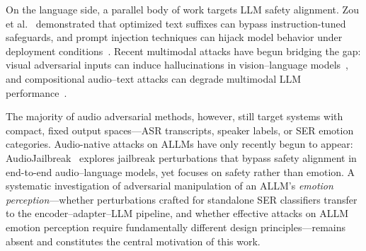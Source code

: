 On the language side, a parallel body of work targets LLM safety alignment.
Zou et al.~\cite{zou2023gcg} demonstrated that optimized text suffixes can bypass instruction-tuned safeguards, and prompt injection techniques can hijack model behavior under deployment conditions~\cite{perez2022ignore}.
Recent multimodal attacks have begun bridging the gap: visual adversarial inputs can induce hallucinations in vision--language models~\cite{mirage}, and compositional audio--text attacks can degrade multimodal LLM performance~\cite{sacred}.

The majority of audio adversarial methods, however, still target systems with compact, fixed output spaces---ASR transcripts, speaker labels, or SER emotion categories.
Audio-native attacks on ALLMs have only recently begun to appear: AudioJailbreak~\cite{audiojailbreak} explores jailbreak perturbations that bypass safety alignment in end-to-end audio--language models, yet focuses on safety rather than emotion.
A systematic investigation of adversarial manipulation of an ALLM's \emph{emotion perception}---whether perturbations crafted for standalone SER classifiers transfer to the encoder--adapter--LLM pipeline, and whether effective attacks on ALLM emotion perception require fundamentally different design principles---remains absent and constitutes the central motivation of this work.
